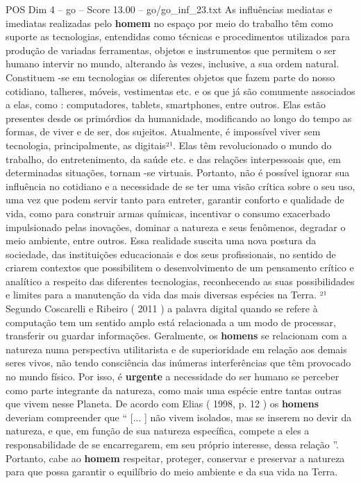 \begin{textsample}{POS Dim 4 – go – Score 13.00 – go/go\_inf\_23.txt}
As influências mediatas e imediatas realizadas pelo \textbf{homem} no espaço por meio do trabalho têm como suporte as tecnologias, entendidas como técnicas e procedimentos utilizados para produção de variadas ferramentas, objetos e instrumentos que permitem o ser humano intervir no mundo, alterando às vezes, inclusive, a sua ordem natural.
Constituem -se em tecnologias os diferentes objetos que fazem parte do nosso cotidiano, talheres, móveis, vestimentas etc. e os que já são comumente associados a elas, como : computadores, tablets, smartphones, entre outros.
Elas estão presentes desde os primórdios da humanidade, modificando ao longo do tempo as formas, de viver e de ser, dos sujeitos.
Atualmente, é impossível viver sem tecnologia, principalmente, as digitais²¹.
Elas têm revolucionado o mundo do trabalho, do entretenimento, da saúde etc. e das relações interpessoais que, em determinadas situações, tornam -se virtuais.
Portanto, não é possível ignorar sua influência no cotidiano e a necessidade de se ter uma visão crítica sobre o seu uso, uma vez que podem servir tanto para entreter, garantir conforto e qualidade de vida, como para construir armas químicas, incentivar o consumo exacerbado impulsionado pelas inovações, dominar a natureza e seus fenômenos, degradar o meio ambiente, entre outros.
Essa realidade suscita uma nova postura da sociedade, das instituições educacionais e dos seus profissionais, no sentido de criarem contextos que possibilitem o desenvolvimento de um pensamento crítico e analítico a respeito das diferentes tecnologias, reconhecendo as suas possibilidades e limites para a manutenção da vida das mais diversas espécies na Terra. ²¹ Segundo Coscarelli e Ribeiro ( 2011 ) a palavra digital quando se refere à computação tem um sentido amplo está relacionada a um modo de processar, transferir ou guardar informações.
Geralmente, os \textbf{homens} se relacionam com a natureza numa perspectiva utilitarista e de superioridade em relação aos demais seres vivos, não tendo consciência das inúmeras interferências que têm provocado no mundo físico.
Por isso, é \textbf{urgente} a necessidade do ser humano se perceber como parte integrante da natureza, como mais uma espécie entre tantas outras que vivem nesse Planeta.
De acordo com Elias ( 1998, p. 12 ) os \textbf{homens} deveriam compreender que “ [... ] não vivem isolados, mas se inserem no devir da natureza, e que, em função de sua natureza específica, compete a eles a responsabilidade de se encarregarem, em seu próprio interesse, dessa relação ”.
Portanto, cabe ao \textbf{homem} respeitar, proteger, conservar e preservar a natureza para que possa garantir o equilíbrio do meio ambiente e da sua vida na Terra.

\end{textsample}
